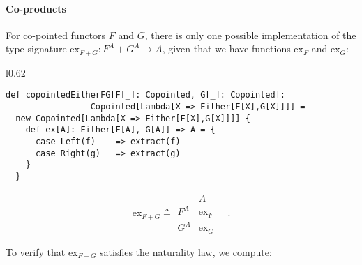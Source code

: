 \paragraph{Co-products}

For co-pointed functors $F$ and $G$, there is only one possible
implementation of the type signature $\text{ex}_{F+G}:F^{A}+G^{A}\rightarrow A$,
given that we have functions $\text{ex}_{F}$ and $\text{ex}_{G}$:

\begin{wrapfigure}{l}{0.62\columnwidth}%
\vspace{-0.85\baselineskip}
\begin{lstlisting}
def copointedEitherFG[F[_]: Copointed, G[_]: Copointed]:
                 Copointed[Lambda[X => Either[F[X],G[X]]]] =
  new Copointed[Lambda[X => Either[F[X],G[X]]]] {
    def ex[A]: Either[F[A], G[A]] => A = {
      case Left(f)    => extract(f)
      case Right(g)   => extract(g)
    }
  }
\end{lstlisting}
\vspace{-2.5\baselineskip}
\end{wrapfigure}%

\noindent \vspace{-0.15\baselineskip}
\[
\text{ex}_{F+G}\triangleq\begin{array}{|c||c|}
 & A\\
\hline F^{A} & \text{ex}_{F}\\
G^{A} & \text{ex}_{G}
\end{array}\quad.
\]

To verify that $\text{ex}_{F+G}$ satisfies the naturality law, we
compute: 

